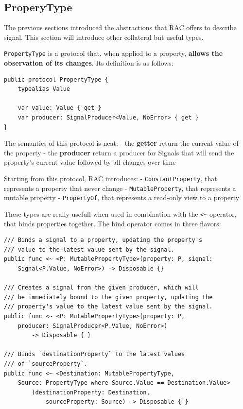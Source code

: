 \subsection{ProperyType}\label{properytype}

The previous sections introduced the abstractions that RAC offers to
describe signal. This section will introduce other collateral but
useful types.

\texttt{PropertyType} is a protocol that, when applied to a property,
\textbf{allows the observation of its changes}. Its definition is as
follows:

\begin{verbatim}
public protocol PropertyType {
    typealias Value

    var value: Value { get }
    var producer: SignalProducer<Value, NoError> { get }
}
\end{verbatim}

The semantics of this protocol is neat: - the \textbf{getter} return the
current value of the property - the \textbf{producer} return a producer
for Signals that will send the property's current value followed by all
changes over time

Starting from this protocol, RAC introduces: -
\texttt{ConstantProperty}, that represents a property that never change
- \texttt{MutableProperty}, that represents a mutable property -
\texttt{PropertyOf}, that represents a read-only view to a property

These types are really usefull when used in combination with the
\texttt{\textless{}\textasciitilde{}} operator, that binds properties
together. The bind operator comes in three flavors:

\begin{verbatim}
/// Binds a signal to a property, updating the property's
/// value to the latest value sent by the signal.
public func <~ <P: MutablePropertyType>(property: P, signal: 
	Signal<P.Value, NoError>) -> Disposable {}

/// Creates a signal from the given producer, which will 
/// be immediately bound to the given property, updating the 
/// property's value to the latest value sent by the signal.
public func <~ <P: MutablePropertyType>(property: P, 
	producer: SignalProducer<P.Value, NoError>) 
		-> Disposable { }

/// Binds `destinationProperty` to the latest values 
/// of `sourceProperty`.
public func <~ <Destination: MutablePropertyType, 
	Source: PropertyType where Source.Value == Destination.Value>
		(destinationProperty: Destination, 
			sourceProperty: Source) -> Disposable { }
\end{verbatim}

